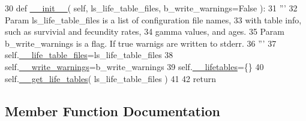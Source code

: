 \begin{DoxyCode}
30     \textcolor{keyword}{def }\hyperlink{classnegui_1_1pgsimupopresources_1_1PGSimuPopResources_a8e79c3f4c6c291a606c9f0c2f259a293}{\_\_init\_\_}( self, ls\_life\_table\_files, b\_write\_warnings=False ):
31         \textcolor{stringliteral}{'''}
32 \textcolor{stringliteral}{        Param ls\_life\_table\_files is a list of configuration file names,}
33 \textcolor{stringliteral}{            with table info, such as survivial and fecundity rates,}
34 \textcolor{stringliteral}{            gamma values, and ages.}
35 \textcolor{stringliteral}{        Param b\_write\_warnings is a flag. If true warnigs are written to stderr.}
36 \textcolor{stringliteral}{        '''}
37         self.\hyperlink{classnegui_1_1pgsimupopresources_1_1PGSimuPopResources_a70ffb8eb62a843aec8f42e337c81fc3b}{\_\_life\_table\_files}=ls\_life\_table\_files
38         self.\hyperlink{classnegui_1_1pgsimupopresources_1_1PGSimuPopResources_ae4805ab6ba55817bc2e40fd622d76483}{\_\_write\_warnings}=b\_write\_warnings
39         self.\hyperlink{classnegui_1_1pgsimupopresources_1_1PGSimuPopResources_ae32ca7cc4b6a1563734a82da0a0c6608}{\_\_lifetables}=\{\}
40         self.\hyperlink{classnegui_1_1pgsimupopresources_1_1PGSimuPopResources_aed06da70af5eea2be1c6caabf35032af}{\_\_get\_life\_tables}( ls\_life\_table\_files )
41 
42         \textcolor{keywordflow}{return}
\end{DoxyCode}


\subsection{Member Function Documentation}
